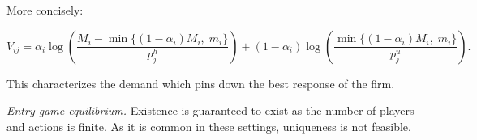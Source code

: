 \documentclass[12pt]{article}
\begin{document}
More concisely:

\[
V_{ij}
=
\alpha_i\log\left(
\frac{M_i-\min\{(1-\alpha_i)M_i,\;m_i\}}{p^h_j}
\right)
+
(1-\alpha_i)\log\left(
\frac{\min\{(1-\alpha_i)M_i,\;m_i\}}{p^u_j}
\right).
\]

This characterizes the demand which pins down the best response of the firm.

\textit{Entry game equilibrium.} Existence is guaranteed to exist as the number of players and actions is finite. As it is common in these settings, uniqueness is not feasible.

\end{document}
